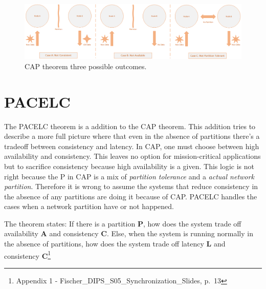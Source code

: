 \begin{figure}[h!]
	\centering
	\includegraphics[width=0.9\linewidth]{consistency/fig/cap_proof.png}
	\caption{CAP theorem three possible outcomes.}
	\label{fig:cap_proof}
\end{figure}


\section{PACELC}
The PACELC theorem is a addition to the CAP theorem. This addition tries to describe a more full picture where that even in the absence of partitions there's a tradeoff between consistency and latency. In CAP, one must choose between high availability and consistency. This leaves no option for mission-critical applications but to sacrifice consistency because high availability is a given. This logic is not right because the P in CAP is a mix of \textit{partition tolerance} and a \textit{actual network partition}. Therefore it is wrong to assume the systems that reduce consistency in the absence of any partitions are doing it because of CAP. PACELC handles the cases when a network partition have or not happened.

\noindent The theorem states: If there is a partition \textbf{P}, how does the system trade off availability \textbf{A} and consistency \textbf{C}. Else, when the system is running normally in
the absence of partitions, how does the system trade off latency \textbf{L}
and consistency \textbf{C}\footnote{Appendix 1 - Fischer\_DIPS\_S05\_Synchronization\_Slides, p.~13}

